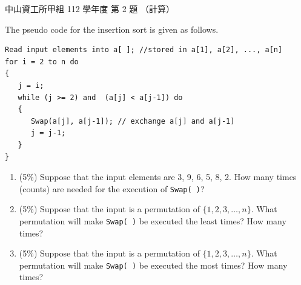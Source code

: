 \begin{pastexam}[label={px:nsysu-112-osds-02}]{中山資工所甲組 112 學年度 第 2 題}
（計算）

The pseudo code for the insertion sort is given as follows.
\begin{verbatim}
Read input elements into a[ ]; //stored in a[1], a[2], ..., a[n]
for i = 2 to n do
{
   j = i;
   while (j >= 2) and  (a[j] < a[j-1]) do
   {
      Swap(a[j], a[j-1]); // exchange a[j] and a[j-1]
      j = j-1;
   }
}
\end{verbatim}
\begin{enumerate}[label=(\alph*)]
\item (5\%) Suppose that the input elements are 3, 9, 6, 5, 8, 2. How many times (counts) are needed for
the execution of \texttt{Swap( )}?
\item (5\%) Suppose that the input is a permutation of $\{1,2,3,\ldots,n\}$. What permutation will make
\texttt{Swap( )} be executed the least times? How many times?
\item (5\%) Suppose that the input is a permutation of $\{1,2,3,\ldots,n\}$. What permutation will make
\texttt{Swap( )} be executed the most times? How many times?
\end{enumerate}
\end{pastexam}


